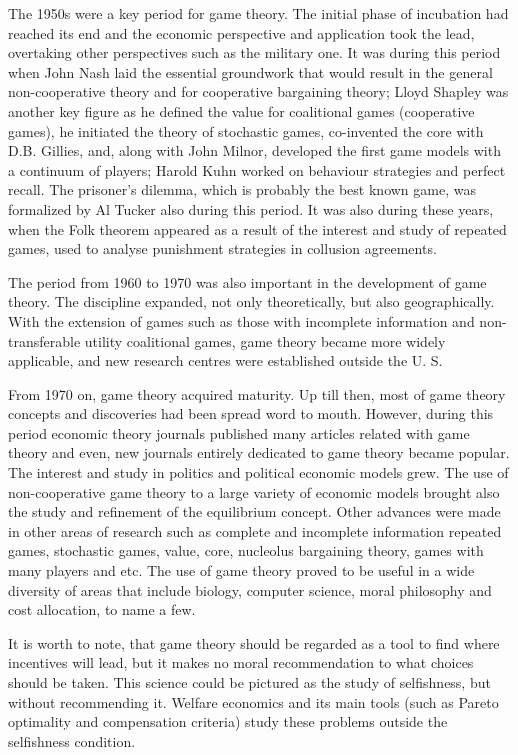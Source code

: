 \documentclass[]{report}
\begin{document}
The 1950s were a key period for game theory. The initial phase of incubation had reached its end and the economic perspective and application took the lead, overtaking other perspectives such as the military one. It was during this period when John Nash laid the essential groundwork that would result in the general non-cooperative theory and for cooperative bargaining theory; Lloyd Shapley was another key figure as he defined the value for coalitional games (cooperative games), he initiated the theory of stochastic games, co-invented the core with D.B. Gillies, and, along with John Milnor, developed the first game models with a continuum of players; Harold Kuhn worked on behaviour strategies and perfect recall. The prisoner’s dilemma, which is probably the best known game, was formalized by Al Tucker also during this period. It was also during these years, when the Folk theorem appeared as a result of the interest and study of repeated games, used to analyse punishment strategies in collusion agreements.

The period from 1960 to 1970 was also important in the development of game theory. The discipline expanded, not only theoretically, but also geographically. With the extension of games such as those with incomplete information and non-transferable utility coalitional games, game theory became more widely applicable, and new research centres were established outside the U. S.

From 1970 on, game theory acquired maturity. Up till then, most of game theory concepts and discoveries had been spread word to mouth. However, during this period economic theory journals published many articles related with game theory and even, new journals entirely dedicated to game theory became popular. The interest and study in politics and political economic models grew. The use of non-cooperative game theory to a large variety of economic models brought also the study and refinement of the equilibrium concept. Other advances were made in other areas of research such as complete and incomplete information repeated games, stochastic games, value, core, nucleolus bargaining theory, games with many players and etc. The use of game theory proved to be useful in a wide diversity of areas that include biology, computer science, moral philosophy and cost allocation, to name a few.

It is worth to note, that game theory should be regarded as a tool to find where incentives will lead, but it makes no moral recommendation to what choices should be taken. This science could be pictured as the study of selfishness, but without recommending it.  Welfare economics and its main tools (such as Pareto optimality and compensation criteria) study these problems outside the selfishness condition.
\newpage
\end{document}
